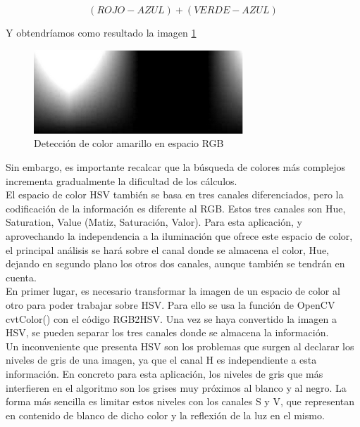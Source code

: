 \[(ROJO - AZUL) + (VERDE - AZUL) \]

Y obtendríamos como resultado la imagen \ref{rgbamarillo}\\

\begin{figure}[h]
\centering
\includegraphics[width=0.7\textwidth]{images/rgbamarillo}%
\caption{Detección de color amarillo en espacio RGB}
\label{rgbamarillo}
\end{figure}
\FloatBarrier

Sin embargo, es importante recalcar que la búsqueda de colores más complejos incrementa gradualmente la dificultad de los cálculos.\\

El espacio de color HSV también se basa en tres canales diferenciados, pero la codificación de la información es diferente al RGB. Estos tres canales son Hue, Saturation, Value (Matiz, Saturación, Valor). Para esta aplicación, y aprovechando la independencia a la iluminación que ofrece este espacio de color, el principal análisis se hará sobre el canal donde se almacena el color, Hue, dejando en segundo plano los otros dos canales, aunque también se tendrán en cuenta.\\

En primer lugar, es necesario transformar la imagen de un espacio de color al otro para poder trabajar sobre HSV.  Para ello se usa la función de OpenCV cvtColor() con el código RGB2HSV. Una vez se haya convertido la imagen a HSV, se pueden separar los tres canales donde se almacena la información.\\

Un inconveniente que presenta HSV son los problemas que surgen al declarar los niveles de gris de una imagen, ya que el canal H es independiente a esta información. En concreto para esta aplicación, los niveles de gris que más interfieren en el algoritmo son los grises muy próximos al blanco y al negro. La forma más sencilla es limitar estos niveles con los canales S y V, que representan en contenido de blanco de dicho color y la reflexión de la luz en el mismo.\\

